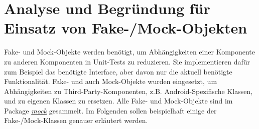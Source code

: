 \documentclass[12pt]{article}
\begin{document}
\newpage
\section{Analyse und Begründung für Einsatz von Fake-/Mock-Objekten}

Fake- und Mock-Objekte werden benötigt, um Abhängigkeiten einer Komponente zu anderen Komponenten in Unit-Tests zu reduzieren.
Sie implementieren dafür zum Beispiel das benötigte Interface, aber davon nur die aktuell benötigte Funktionalität.
Fake- und auch Mock-Objekte wurden eingesetzt, um Abhängigkeiten zu Third-Party-Komponenten, z.B. Android-Spezifische Klassen, und zu eigenen Klassen zu ersetzen.
Alle Fake- und Mock-Objekte sind im Package \textit{\href{https://github.com/lukaspanni/OpenSourceStats/tree/main/app/src/test/java/de/lukaspanni/opensourcestats/mock}{mock}} gesammelt.
\newline
Im Folgenden sollen beispielhaft einige der Fake-/Mock-Klassen genauer erläutert werden.
\newpage
\end{document}

